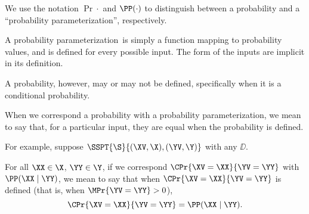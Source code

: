 \begin{note}
  \def\paramprob{probability parameterization}
  We use the notation $\Pr{\cdot}$ and $\PP(\cdot)$ to 
  distinguish between a probability and a ``\paramprob'',
  respectively.

  A \paramprob\ is simply a function mapping 
  to probability values, and is defined for every possible input.
  The form of the inputs are implicit in its definition.

  A probability, however, may or may not be defined, specifically
  when it is a conditional probability.

  When we correspond a probability with a \paramprob,
  we mean to say that, for a particular input, 
  they are equal when the probability is defined.

  For example, suppose $\SSPT{\S}{(\XV,\X),(\YV,\Y)}$ with any $\DD$.

  For all $\XX \in \X$, $\YY \in \Y$,
  if we correspond $\CPr{\XV = \XX}{\YV = \YY}$ with $\PP(\XX \mid \YY)$,
  we mean to say that when $\CPr{\XV = \XX}{\YV = \YY}$ is defined (that is, when $\MPr{\YV = \YY} > 0$),
  $$\CPr{\XV = \XX}{\YV = \YY} = \PP(\XX \mid \YY).$$%
\end{note}
